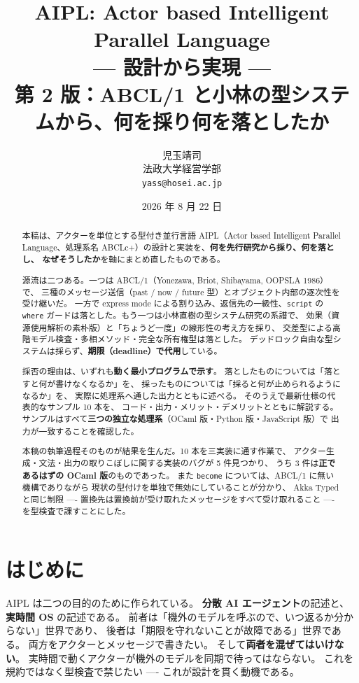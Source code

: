 \documentclass[11pt,a4paper]{ltjsarticle}
\title{\bfseries AIPL: Actor based Intelligent Parallel Language\\[2mm]
       \large --- 設計から実現 ---\\[1mm]
       \normalsize 第 2 版：ABCL/1 と小林の型システムから、何を採り何を落としたか}
\author{児玉靖司\\\small 法政大学経営学部\\\small \texttt{yass@hosei.ac.jp}}
\date{2026 年 8 月 22 日}
\theoremstyle{definition}
\theoremstyle{remark}
\begin{document}
\maketitle

\begin{abstract}
本稿は、アクターを単位とする型付き並行言語 AIPL（Actor based Intelligent Parallel
Language、処理系名 ABCLc+）の設計と実装を、\textbf{何を先行研究から採り、何を落とし、
なぜそうしたか}を軸にまとめ直したものである。

源流は二つある。一つは ABCL/1（Yonezawa, Briot, Shibayama, OOPSLA 1986）で、
三種のメッセージ送信（past / now / future 型）とオブジェクト内部の逐次性を受け継いだ。
一方で express mode による割り込み、返信先の一級性、\texttt{script} の \texttt{where}
ガードは落とした。もう一つは小林直樹の型システム研究の系譜で、
効果（資源使用解析の素朴版）と「ちょうど一度」の線形性の考え方を採り、
交差型による高階モデル検査・多相メソッド・完全な所有権型は落とした。
デッドロック自由な型システムは採らず、\textbf{期限（deadline）で代用}している。

採否の理由は、いずれも\textbf{動く最小プログラムで示す}。
落としたものについては「落とすと何が書けなくなるか」を、
採ったものについては「採ると何が止められるようになるか」を、
実際に処理系へ通した出力とともに述べる。
そのうえで最新仕様の代表的なサンプル 10 本を、
コード・出力・メリット・デメリットとともに解説する。
サンプルはすべて\textbf{三つの独立な処理系}（OCaml 版・Python 版・JavaScript 版）で
出力が一致することを確認した。

本稿の執筆過程そのものが結果を生んだ。10 本を三実装に通す作業で、
アクター生成・文法・出力の取りこぼしに関する実装のバグが 5 件見つかり、
うち 3 件は\textbf{正であるはずの OCaml 版}のものであった。
また \texttt{become} については、ABCL/1 に無い機構でありながら
現状の型付けを単独で無効にしていることが分かり、
Akka Typed と同じ制限 ---- 置換先は置換前が受け取れたメッセージをすべて受け取れること ----
を型検査で課すことにした。
\end{abstract}

\tableofcontents
\newpage

\section{はじめに}
\label{sec:intro}

AIPL は二つの目的のために作られている。
\textbf{分散 AI エージェント}の記述と、\textbf{実時間 OS} の記述である。
前者は「機外のモデルを呼ぶので、いつ返るか分からない」世界であり、
後者は「期限を守れないことが故障である」世界である。
両方をアクターとメッセージで書きたい。
そして\textbf{両者を混ぜてはいけない}。
実時間で動くアクターが機外のモデルを同期で待ってはならない。
これを規約ではなく型検査で禁じたい ---- これが設計を貫く動機である。
\end{document}

